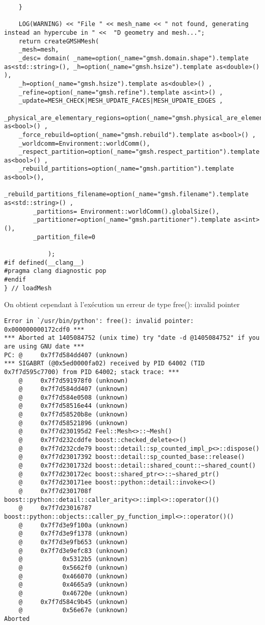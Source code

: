 \documentclass[12pt]{article}
\begin{document}
\begin{lstlisting}
    }

    LOG(WARNING) << "File " << mesh_name << " not found, generating instead an hypercube in " <<  "D geometry and mesh...";
    return createGMSHMesh(
    _mesh=mesh,
    _desc= domain( _name=option(_name="gmsh.domain.shape").template as<std::string>(), _h=option(_name="gmsh.hsize").template as<double>()  ),
    _h=option(_name="gmsh.hsize").template as<double>() ,
    _refine=option(_name="gmsh.refine").template as<int>() ,
    _update=MESH_CHECK|MESH_UPDATE_FACES|MESH_UPDATE_EDGES ,
    _physical_are_elementary_regions=option(_name="gmsh.physical_are_elementary_regions").template as<bool>() ,
    _force_rebuild=option(_name="gmsh.rebuild").template as<bool>() ,
    _worldcomm=Environment::worldComm(),
    _respect_partition=option(_name="gmsh.respect_partition").template as<bool>() ,
    _rebuild_partitions=option(_name="gmsh.partition").template as<bool>(),
    _rebuild_partitions_filename=option(_name="gmsh.filename").template as<std::string>() ,
        _partitions= Environment::worldComm().globalSize(),
        _partitioner=option(_name="gmsh.partitioner").template as<int>(),
        _partition_file=0   

            );
#if defined(__clang__)
#pragma clang diagnostic pop
#endif
} // loadMesh
\end{lstlisting}

On obtient cependant à l'exécution un erreur de type free(): invalid pointer 

\begin{lstlisting}
Error in `/usr/bin/python': free(): invalid pointer: 0x000000000172cdf0 ***
*** Aborted at 1405084752 (unix time) try "date -d @1405084752" if you are using GNU date ***
PC: @     0x7f7d584dd407 (unknown)
*** SIGABRT (@0x5ed0000fa02) received by PID 64002 (TID 0x7f7d595c7700) from PID 64002; stack trace: ***
    @     0x7f7d591978f0 (unknown)
    @     0x7f7d584dd407 (unknown)
    @     0x7f7d584e0508 (unknown)
    @     0x7f7d58516e44 (unknown)
    @     0x7f7d58520b8e (unknown)
    @     0x7f7d58521896 (unknown)
    @     0x7f7d230195d2 Feel::Mesh<>::~Mesh()
    @     0x7f7d232cddfe boost::checked_delete<>()
    @     0x7f7d232cde79 boost::detail::sp_counted_impl_p<>::dispose()
    @     0x7f7d23017392 boost::detail::sp_counted_base::release()
    @     0x7f7d2301732d boost::detail::shared_count::~shared_count()
    @     0x7f7d230172ec boost::shared_ptr<>::~shared_ptr()
    @     0x7f7d230171ee boost::python::detail::invoke<>()
    @     0x7f7d2301708f boost::python::detail::caller_arity<>::impl<>::operator()()
    @     0x7f7d23016787 boost::python::objects::caller_py_function_impl<>::operator()()
    @     0x7f7d3e9f100a (unknown)
    @     0x7f7d3e9f1378 (unknown)
    @     0x7f7d3e9fb653 (unknown)
    @     0x7f7d3e9efc83 (unknown)
    @           0x5312b5 (unknown)
    @           0x5662f0 (unknown)
    @           0x466070 (unknown)
    @           0x4665a9 (unknown)
    @           0x46720e (unknown)
    @     0x7f7d584c9b45 (unknown)
    @           0x56e67e (unknown)
Aborted
\end{lstlisting}
\end{document}
